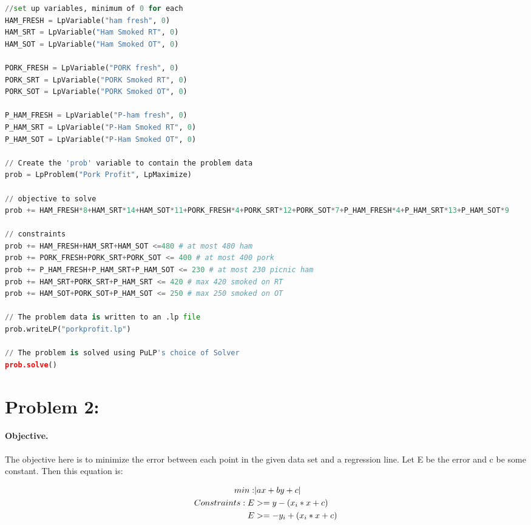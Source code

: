 \documentclass[11pt,letterpaper]{article}
\begin{document}
\begin{lstlisting}[language=python,caption={Code to solve linear program},mathescape]
//set up variables, minimum of 0 for each
HAM_FRESH = LpVariable("ham fresh", 0)
HAM_SRT = LpVariable("Ham Smoked RT", 0)
HAM_SOT = LpVariable("Ham Smoked OT", 0)

PORK_FRESH = LpVariable("PORK fresh", 0)
PORK_SRT = LpVariable("PORK Smoked RT", 0)
PORK_SOT = LpVariable("PORK Smoked OT", 0)

P_HAM_FRESH = LpVariable("P-ham fresh", 0)
P_HAM_SRT = LpVariable("P-Ham Smoked RT", 0)
P_HAM_SOT = LpVariable("P-Ham Smoked OT", 0)

// Create the 'prob' variable to contain the problem data
prob = LpProblem("Pork Profit", LpMaximize)

// objective to solve
prob += HAM_FRESH*8+HAM_SRT*14+HAM_SOT*11+PORK_FRESH*4+PORK_SRT*12+PORK_SOT*7+P_HAM_FRESH*4+P_HAM_SRT*13+P_HAM_SOT*9

// constraints
prob += HAM_FRESH+HAM_SRT+HAM_SOT <=480 # at most 480 ham
prob += PORK_FRESH+PORK_SRT+PORK_SOT <= 400 # at most 400 pork
prob += P_HAM_FRESH+P_HAM_SRT+P_HAM_SOT <= 230 # at most 230 picnic ham
prob += HAM_SRT+PORK_SRT+P_HAM_SRT <= 420 # max 420 smoked on RT
prob += HAM_SOT+PORK_SOT+P_HAM_SOT <= 250 # max 250 smoked on OT

// The problem data is written to an .lp file
prob.writeLP("porkprofit.lp")

// The problem is solved using PuLP's choice of Solver
prob.solve()

\end{lstlisting}


\section*{Problem 2: }

\paragraph{Objective.} \bigskip The objective here is to minimize the error between each point in the given data set and a regression line. Let E be the error and c be some constant. Then this equation is: 

\begin{align*}
 min: \bigskip &|ax + by +c| \\
 Constraints: \bigskip E &>= y - (x_i * x + c) \\
 E &>= -y_i + (x_i * x + c)
\end{align*}
\end{document}
